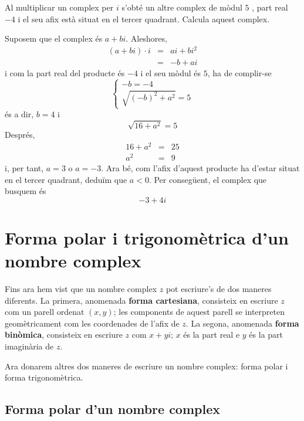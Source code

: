 \begin{exemple}
Al multiplicar un complex per $i$ s’obté un altre complex de mòdul $5$
, part real $-4$ i el seu afix està situat en el tercer quadrant.
Calcula aquest complex.
\end{exemple}

\begin{solucio}
Suposem que el complex és $a+bi$. Aleshores,
\begin{eqnarray*}
(a+bi)\cdot i &=&ai+bi^{2} \\
&=&-b+ai
\end{eqnarray*}
i com la part real del producte és $-4$ i el seu mòdul és $5$, ha de
complir-se
\begin{equation*}
\left\{
\begin{array}{l}
-b=-4 \\
\sqrt{(-b)^{2}+a^{2}}=5
\end{array}
\right.
\end{equation*}
és a dir, $b=4$ i
\begin{equation*}
\sqrt{16+a^{2}}=5
\end{equation*}
Després,
\begin{eqnarray*}
16+a^{2} &=&25 \\
a^{2} &=&9
\end{eqnarray*}
i, per tant, $a=3$ o $a=-3$. Ara bé, com l’afix d’aquest producte ha d’estar situat en el tercer quadrant, deduïm que $a<0$. Per
consegüent, el complex que busquem és
\begin{equation*}
-3+4i
\end{equation*}
\end{solucio}

\section{Forma polar i trigonomètrica d’un nombre complex}

Fins ara hem vist que un nombre complex $z$ pot escriure’s de
dos maneres diferents. La primera, anomenada \textbf{forma cartesiana},
consisteix en escriure $z$ com un parell ordenat $(x,y)$; les components de
aquest parell se interpreten geomètricament com les coordenades de l’afix
de $z$. La segona, anomenada \textbf{forma binòmica}, consisteix en
escriure $z$ com $x+yi$; $x$ és la part real e $y$ és la part imaginària
de $z$.

Ara donarem altres dos maneres de escriure un nombre complex: forma
polar i forma trigonomètrica.

\subsection{Forma polar d’un nombre complex}

